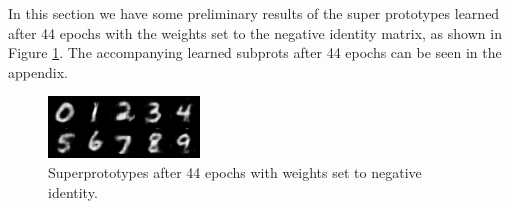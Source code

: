 In this section we have some preliminary results of the super prototypes learned after 44 epochs with the weights set to the negative identity matrix, as shown in Figure \ref{superprots}. The accompanying learned subprots after 44 epochs can be seen in the appendix.

\begin{figure}[ht]
    \centering
    \includegraphics{img/prot44.png}
    \caption{Superprototypes after 44 epochs with weights set to negative identity.}
    \label{superprots}
\end{figure}


